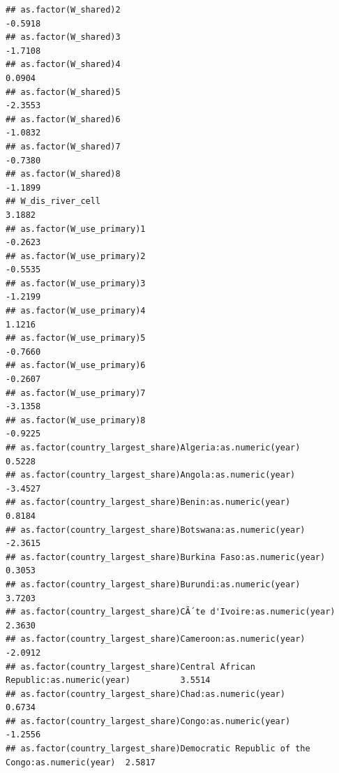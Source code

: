 \documentclass[
  a4paper,
]{article}
\begin{document}
\begin{verbatim}
## as.factor(W_shared)2                                                              -0.5918
## as.factor(W_shared)3                                                              -1.7108
## as.factor(W_shared)4                                                               0.0904
## as.factor(W_shared)5                                                              -2.3553
## as.factor(W_shared)6                                                              -1.0832
## as.factor(W_shared)7                                                              -0.7380
## as.factor(W_shared)8                                                              -1.1899
## W_dis_river_cell                                                                   3.1882
## as.factor(W_use_primary)1                                                         -0.2623
## as.factor(W_use_primary)2                                                         -0.5535
## as.factor(W_use_primary)3                                                         -1.2199
## as.factor(W_use_primary)4                                                          1.1216
## as.factor(W_use_primary)5                                                         -0.7660
## as.factor(W_use_primary)6                                                         -0.2607
## as.factor(W_use_primary)7                                                         -3.1358
## as.factor(W_use_primary)8                                                         -0.9225
## as.factor(country_largest_share)Algeria:as.numeric(year)                           0.5228
## as.factor(country_largest_share)Angola:as.numeric(year)                           -3.4527
## as.factor(country_largest_share)Benin:as.numeric(year)                             0.8184
## as.factor(country_largest_share)Botswana:as.numeric(year)                         -2.3615
## as.factor(country_largest_share)Burkina Faso:as.numeric(year)                      0.3053
## as.factor(country_largest_share)Burundi:as.numeric(year)                           3.7203
## as.factor(country_largest_share)CÃ´te d'Ivoire:as.numeric(year)                    2.3630
## as.factor(country_largest_share)Cameroon:as.numeric(year)                         -2.0912
## as.factor(country_largest_share)Central African Republic:as.numeric(year)          3.5514
## as.factor(country_largest_share)Chad:as.numeric(year)                              0.6734
## as.factor(country_largest_share)Congo:as.numeric(year)                            -1.2556
## as.factor(country_largest_share)Democratic Republic of the Congo:as.numeric(year)  2.5817

\end{verbatim}
\end{document}

